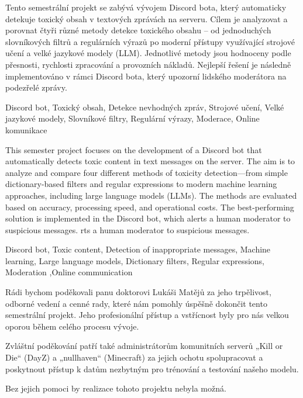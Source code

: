 \documentclass[FM,Proj]{tulthesis}
\begin{document}

\begin{abstractCZ}
Tento semestrální projekt se zabývá vývojem Discord bota, který automaticky detekuje toxický obsah v textových zprávách na serveru. Cílem je analyzovat a porovnat čtyři různé metody detekce toxického obsahu – od jednoduchých slovníkových filtrů a regulárních výrazů po moderní přístupy využívající strojové učení a velké jazykové modely (LLM). Jednotlivé metody jsou hodnoceny podle přesnosti, rychlosti zpracování a provozních nákladů. Nejlepší řešení je následně implementováno v rámci Discord bota, který upozorní lidského moderátora na podezřelé zprávy.

\end{abstractCZ}

\begin{keywordsCZ}Discord bot, Toxický obsah, Detekce nevhodných zpráv, Strojové učení, Velké jazykové modely, Slovníkové filtry, Regulární výrazy, Moderace, Online komunikace
\end{keywordsCZ}

\vspace{2cm}

\begin{abstractEN}

This semester project focuses on the development of a Discord bot that automatically detects toxic content in text messages on the server. The aim is to analyze and compare four different methods of toxicity detection—from simple dictionary-based filters and regular expressions to modern machine learning approaches, including large language models (LLMs). The methods are evaluated based on accuracy, processing speed, and operational costs. The best-performing solution is implemented in the Discord bot, which alerts a human moderator to suspicious messages.
rts a human moderator to suspicious messages.
\end{abstractEN}

\begin{keywordsEN}
Discord bot, Toxic content, Detection of inappropriate messages, Machine learning, Large language models, Dictionary filters, Regular expressions, Moderation ,Online communication
\end{keywordsEN}

\clearpage

\begin{acknowledgement}
Rádi bychom poděkovali panu doktorovi Lukáši Matějů za jeho trpělivost, odborné vedení a cenné rady, které nám pomohly úspěšně dokončit tento semestrální projekt. Jeho profesionální přístup a vstřícnost byly pro nás velkou oporou během celého procesu vývoje.

Zvláštní poděkování patří také administrátorům komunitních serverů „Kill or Die“ (DayZ) a „nullhaven“ (Minecraft) za jejich ochotu spolupracovat a poskytnout přístup k datům nezbytným pro trénování a testování našeho modelu.

Bez jejich pomoci by realizace tohoto projektu nebyla možná.
\end{acknowledgement}
\end{document}
